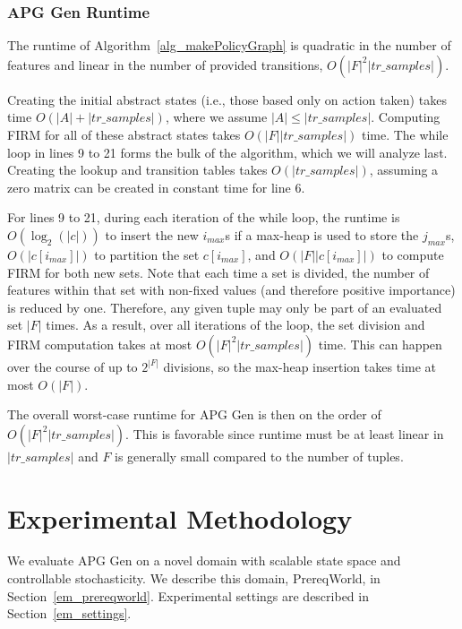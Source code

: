\documentclass[letterpaper]{article} %
\begin{document}
\subsubsection{APG Gen Runtime}
The runtime of Algorithm~\ref{alg_makePolicyGraph} is quadratic in the number of features and linear in the number of provided transitions, $O(|F|^2 |tr\_samples|)$.



Creating the initial abstract states (i.e., those based only on action taken) takes time $O(|A| + |tr\_samples|)$, where we assume $|A| \leq |tr\_samples|$. Computing FIRM for all of these abstract states takes $O(|F| |tr\_samples|)$ time. The while loop in lines 9 to 21 forms the bulk of the algorithm, which we will analyze last. Creating the lookup and transition tables takes $O(|tr\_samples|)$, assuming a zero matrix can be created in constant time for line 6.

For lines 9 to 21, during each iteration of the while loop, the runtime is $O(\log_2(|c|))$ to insert the new $i_{max}$s if a max-heap is used to store the $j_{max}$s, $O(|c[i_{max}]|)$ to partition the set $c[i_{max}]$, and $O(|F| |c[i_{max}]|)$ to compute FIRM for both new sets. Note that each time a set is divided, the number of features within that set with non-fixed values (and therefore positive importance) is reduced by one. Therefore, any given tuple may only be part of an evaluated set $|F|$ times. As a result, over all iterations of the loop, the set division and FIRM computation takes at most $O(|F|^2 |tr\_samples|)$ time. This can happen over the course of up to $2^{|F|}$ divisions, so the max-heap insertion takes time at most $O(|F|)$.

The overall worst-case runtime for APG Gen is then on the order of $O(|F|^2 |tr\_samples|)$. This is favorable since runtime must be at least linear in $|tr\_samples|$ and $F$ is generally small compared to the number of tuples.

\section{Experimental Methodology}
We evaluate APG Gen on a novel domain with scalable state space and controllable stochasticity. We describe this domain, PrereqWorld, in Section~\ref{em_prereqworld}. Experimental settings are described in Section~\ref{em_settings}.
\end{document}
